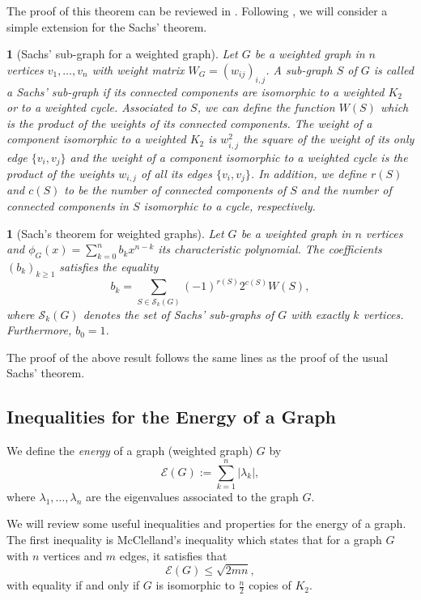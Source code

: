 \documentclass[a4paper]{article}
\newcommand{\abs}[1]{\left\lvert#1\right\rvert}
\newcommand{\energy}[1]{\mathcal{E}\left(#1\right)}
\theoremstyle{plain}
\newtheorem{definition}{\protect\defname}
\newtheorem{theorem}{\protect\thmaname}
\newcommand{\defname}{}\newcommand{\propname}{}\newcommand{\thmaname}{}\newcommand{\lemmaname}{}\newcommand{\corname}{}\newcommand{\exname}{}\newcommand{\rename}{} %
\renewcommand{\defname}{Definition}
\renewcommand{\propname}{Proposition}
\renewcommand{\thmaname}{Theorem}%
\renewcommand{\lemmaname}{Lemma}
\renewcommand{\corname}{Corollary}
\renewcommand{\exname}{Example}
\renewcommand{\rename}{Remark}%
\renewcommand{\defname}{Definici\'on}
\renewcommand{\propname}{Proposici\'on}
\renewcommand{\thmaname}{Teorema}%
\renewcommand{\lemmaname}{Lema}
\renewcommand{\corname}{Corolario}
\renewcommand{\exname}{Ejemplo}\renewcommand{\rename}{Observaci\'on}%
\begin{document}
The proof of this theorem can be reviewed in  \cite{Cvectovik}.
Following \cite{Mariya05}, we will consider a simple extension for the Sachs' theorem.

\begin{definition}[Sachs' sub-graph for a weighted graph]
    Let \(G\) be a weighted graph in \(n\) vertices \(v_1, \ldots, v_n\) with weight matrix \(W_G = (w_{ij})_{i,j}\). A sub-graph \(S\) of \(G\) is called a Sachs' sub-graph if its connected components are isomorphic to a weighted \(K_2\) or to a weighted cycle. Associated to \(S\), we can define the function \(W(S)\) which is the product of the weights of its connected components. The weight of a component isomorphic to a weighted \(K_2\) is \(w_{i,j}^2\) the square of the weight of its only edge \(\{v_i,v_j\}\) and the weight of a component isomorphic to a weighted cycle is the product of the weights \(w_{i,j}\) of all its edges \(\{v_i,v_j\}\). In addition, we define \(r(S)\) and \(c(S)\) to be the number of connected components of \(S\) and the number of connected components in \(S\) isomorphic to a cycle, respectively.
    
\end{definition}

\begin{theorem}[Sach's theorem for weighted graphs]
    Let \(G\) be a weighted graph in \(n\) vertices and \(\phi_G(x) = \sum_{k = 0}^n b_k x^{n-k}\) its characteristic polynomial. The coefficients \((b_k)_{k \geq 1}\) satisfies the equality
    \[
        b_k = \sum_{S \in \mathcal{S}_k(G)} (-1)^{r(S)}2^{c(S)}W(S),
    \]
    where \(\mathcal{S}_k(G)\) denotes the set of Sachs' sub-graphs of \(G\) with exactly \(k\) vertices. Furthermore, \(b_0 = 1\).
    
\end{theorem}

The proof of the above result follows the same lines as the proof of the usual Sachs' theorem.

\subsection{Inequalities for the Energy of a Graph}

We define the \textit{energy} of a graph (weighted graph) \(G\) by
\[
    \energy{G} := \sum_{k = 1}^n \abs{\lambda_k},
\]
where \(\lambda_1, \ldots, \lambda_n\) are the eigenvalues associated to the graph \(G\).

We will review some useful inequalities and properties for the energy of a graph. The first inequality is McClelland's inequality \cite{McClelland71} which states that for a graph \(G\) with \(n\) vertices and \(m\) edges, it satisfies that
\begin{equation}\label{McClelland}
    \energy{G} \leq \sqrt{2mn},
\end{equation}
with equality if and only if \(G\) is isomorphic to \(\frac{n}{2}\) copies of \(K_2\).
\end{document}
